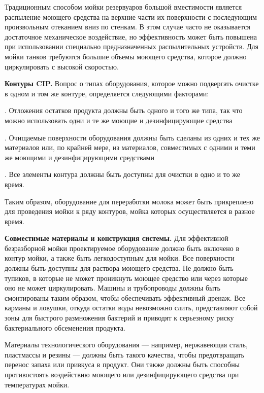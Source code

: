 {\par \redline Традиционным способом мойки резервуаров большой вместимости является распыление моющего средства на верхние части их поверхности с последующим произвольным отеканием вниз по стенкам. В этом случае часто не оказывается достаточное механическое воздействие, но эффективность может быть повышена при использовании специально предназначенных распылительных устройств. Для мойки танков требуются большие объемы моющего средства, которое должно циркулировать с высокой скоростью.

\par \redline \textbf{Контуры CIP.} Вопрос о типах оборудования, которое можно подвергать очистке в одном и том же контуре, определяется следующими факторами:


\par {}. Отложения остатков продукта должны быть одного и того же типа, так что можно использовать одни и те же моющие и дезинфицирующие средства
\par {}. Очищаемые поверхности оборудования должны быть сделаны из одних и тех же материалов или, по крайней мере, из материалов, совместимых с одними и теми же моющими и дезинфицирующими средствами
\par {}. Все элементы контура должны быть доступны для очистки в одно и то же время.
\par

\par \redline Таким образом, оборудование для переработки молока может быть прикреплено для проведения мойки к ряду контуров, мойка которых осуществляется в разное время.

\par \redline \textbf{Совместимые материалы и конструкция системы.} Для эффективной безразборной мойки проектируемое оборудование должно быть включено в контур мойки, а также быть легкодоступным для мойки. Все поверхности должны быть доступны для раствора моющего средства. Не должно быть тупиков, в которые не может проникнуть моющее средство или через которые оно не может циркулировать. Машины и трубопроводы должны быть смонтированы таким образом, чтобы обеспечивать эффективный дренаж. Все карманы и ловушки, откуда остатки воды невозможно слить, представляют собой зоны для быстрого размножения бактерий и приводят к серьезному риску бактериального обсеменения продукта.



\par \redline Материалы технологического оборудования — например, нержавеющая сталь, пластмассы и резины — должны быть такого качества, чтобы предотвращать перенос запаха или привкуса в продукт. Они также должны быть способны противостоять воздействию моющего или дезинфицирующего средства при температурах мойки.



}
